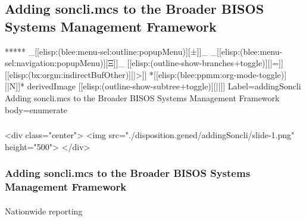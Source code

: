 \begin{whenOrg}
\section{Adding soncli.mcs to the Broader BISOS Systems Management Framework}


\begin{whenOrg}
*****  _[[elisp:(blee:menu-sel:outline:popupMenu)][±]]_ _[[elisp:(blee:menu-sel:navigation:popupMenu)][Ξ]]_ [[elisp:(outline-show-branches+toggle)][|=]] [[elisp:(bx:orgm:indirectBufOther)][|>]] *[[elisp:(blee:ppmm:org-mode-toggle)][|N]]*  derivedImage [[elisp:(outline-show-subtree+toggle)][||]] Label=addingSoncli Adding soncli.mcs to the Broader BISOS Systems Management Framework body=enumerate
\end{whenOrg}

\begin{htmlonly}

\begin{frame}[fragile,plain,label=addingSoncli]
    \frametitle{}
    \framesubtitle{}
    \begin{rawhtml}
<div class="center">
<img src="./disposition.gened/addingSoncli/slide-1.png" height="500">
</div>
    \end{rawhtml}
\end{frame}
\end{htmlonly}

\begin{verblatex}

\begin{frame}[fragile,plain,label=addingSoncli]
    \frametitle{Adding soncli.mcs to the Broader BISOS Systems Management Framework}
    \framesubtitle{}


    Nationwide reporting




\end{frame}
\end{verblatex}



\end{whenOrg}
